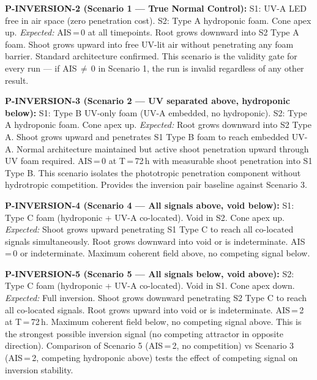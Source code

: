 \documentclass[10pt, a4paper]{article}
\begin{document}
\begin{mdframed}[
  backgroundcolor=notebox,
  linecolor=rulecolor,
  linewidth=0.8pt,
  innertopmargin=0.5em,
  innerbottommargin=0.5em,
  innerleftmargin=0.8em,
  innerrightmargin=0.8em
]
\textbf{P-INVERSION-2 (Scenario 1 --- True Normal Control):}
S1: UV-A LED free in air space (zero penetration cost).
S2: Type A hydroponic foam. Cone apex up.
\textit{Expected:} AIS\,=\,0 at all timepoints.
Root grows downward into S2 Type A foam.
Shoot grows upward into free UV-lit air without
penetrating any foam barrier.
Standard architecture confirmed.
This scenario is the validity gate for every run ---
if AIS\,$\ne$\,0 in Scenario 1, the run is invalid
regardless of any other result.

\medskip
\textbf{P-INVERSION-3 (Scenario 2 --- UV separated above,
hydroponic below):}
S1: Type B UV-only foam (UV-A embedded, no hydroponic).
S2: Type A hydroponic foam. Cone apex up.
\textit{Expected:} Root grows downward into S2 Type A.
Shoot grows upward and penetrates S1 Type B foam to
reach embedded UV-A. Normal architecture maintained
but active shoot penetration upward through UV foam required.
AIS\,=\,0 at T\,=\,72\,h with measurable shoot penetration
into S1 Type B.
This scenario isolates the phototropic penetration
component without hydrotropic competition.
Provides the inversion pair baseline against Scenario 3.

\medskip
\textbf{P-INVERSION-4 (Scenario 4 --- All signals above,
void below):}
S1: Type C foam (hydroponic + UV-A co-located). Void in S2.
Cone apex up.
\textit{Expected:} Shoot grows upward penetrating S1 Type C
to reach all co-located signals simultaneously.
Root grows downward into void or is indeterminate.
AIS\,=\,0 or indeterminate.
Maximum coherent field above, no competing signal below.

\medskip
\textbf{P-INVERSION-5 (Scenario 5 --- All signals below,
void above):}
S2: Type C foam (hydroponic + UV-A co-located). Void in S1.
Cone apex down.
\textit{Expected:} Full inversion. Shoot grows downward
penetrating S2 Type C to reach all co-located signals.
Root grows upward into void or is indeterminate.
AIS\,=\,2 at T\,=\,72\,h.
Maximum coherent field below, no competing signal above.
This is the strongest possible inversion signal
(no competing attractor in opposite direction).
Comparison of Scenario 5 (AIS\,=\,2, no competition)
vs Scenario 3 (AIS\,=\,2, competing hydroponic above)
tests the effect of competing signal on inversion
stability.
\end{mdframed}
\end{document}
